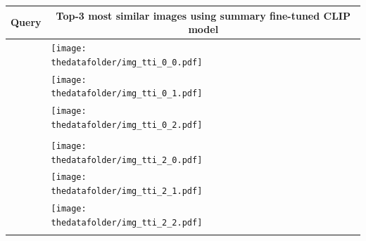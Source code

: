 \documentclass{article} %
\begin{document}
   \begin{table}[h!]
     \centering
     \begin{tabular}{m{2.7cm} p{2.9cm} p{2.9cm} p{2.9cm}}
         \toprule
         \centering \bfseries Query & \multicolumn{3}{c}{\bfseries{Top-3 most similar images using \textcolor{deepred}{summary fine-tuned CLIP model}}} \tabularnewline
         \midrule
          \texttt{} \vspace{20mm} & \centering \texttt{[image: \\thedatafolder/img\_tti\_0\_0.pdf]} \\  & \centering \texttt{[image: \\thedatafolder/img\_tti\_0\_1.pdf]} \\  & \centering \texttt{[image: \\thedatafolder/img\_tti\_0\_2.pdf]} \\   \tabularnewline
         \midrule
         \texttt{} \vspace{20mm} & \centering \texttt{[image: \\thedatafolder/img\_tti\_2\_0.pdf]} \\  & \centering \texttt{[image: \\thedatafolder/img\_tti\_2\_1.pdf]} \\  & \centering \texttt{[image: \\thedatafolder/img\_tti\_2\_2.pdf]} \\   \tabularnewline

\end{tabular}
\end{table}
\end{document}
